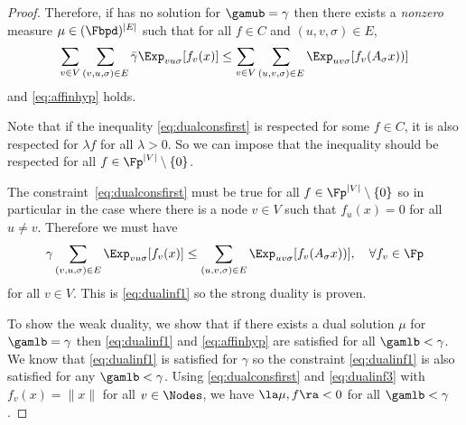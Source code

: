 \begin{lemma}
\begin{proof}
    Therefore, if  has no solution for $\gamub = \gamma$ then there exists
    a \emph{nonzero} measure $\mu \in (\Fbpd)^{|E|}$ such that for all $f \in C$ and $(u,v,\sigma) \in E$,
    \begin{equation}
      \label{eq:dualconsfirst}
      \sum_{v \in V} \sum_{(v,u,\sigma) \in E} \bar{\gamma} \Exp_{vu\sigma}[f_v(x)] \leq \sum_{v \in V} \sum_{(u,v,\sigma) \in E} \Exp_{uv\sigma}[f_v(A_\sigma x))]
    \end{equation}
    and \eqref{eq:affinhyp} holds.

    Note that if the inequality \eqref{eq:dualconsfirst} is respected for some $f \in C$, it is also respected for $\lambda f$ for all $\lambda > 0$.
    So we can impose that the inequality should be respected for all $f \in \Fp^{|V|} \setminus \{0\}$.

    The constraint~\eqref{eq:dualconsfirst} must be true for all $f \in \Fp^{|V|} \setminus \{0\}$ so in particular in the case where there is a node $v \in V$ such that $f_u(x) = 0$ for all $u \neq v$.
    Therefore we must have
    \[ \gamma \sum_{(v,u,\sigma) \in E} \Exp_{vu\sigma}[f_v(x)] \leq \sum_{(u,v,\sigma) \in E} \Exp_{uv\sigma}[f_v(A_\sigma x))], \quad \forall f_v \in \Fp \]
    for all $v \in V$.
    This is \eqref{eq:dualinf1} so the strong duality is proven.

    To show the weak duality, we show that if there exists a dual solution $\mu$ for $\gamlb=\gamma$ then \eqref{eq:dualinf1} and \eqref{eq:affinhyp} are satisfied for all $\gamlb < \gamma$.
    We know that \eqref{eq:dualinf1} is satisfied for $\gamma$ so the constraint \eqref{eq:dualinf1} is also satisfied for any $\gamlb < \gamma$.
    Using \eqref{eq:dualconsfirst} and \eqref{eq:dualinf3} with $f_v(x) = \|x\|$ for all $v \in \Nodes$,
    we have $\la \mu, f \ra < 0$ for all $\gamlb < \gamma$.

  \end{proof}
\end{lemma}
